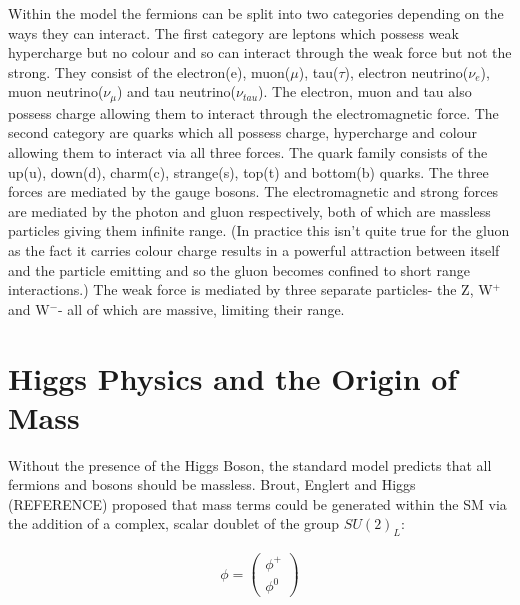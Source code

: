 Within the model the fermions can be split into two categories depending on the ways they can interact. The first category are leptons which possess weak hypercharge but no colour and so can interact through the weak force but not the strong. They consist of the electron(e), muon($\mu$), tau($\tau$), electron neutrino($\nu_{e}$), muon neutrino($\nu_{\mu}$) and tau neutrino($\nu_{tau}$). The electron, muon and tau also possess charge allowing them to interact through the electromagnetic force. The second category are quarks which all possess charge, hypercharge and colour allowing them to interact via all three forces. The quark family consists of the up(u), down(d), charm(c), strange(s), top(t) and bottom(b) quarks. The three forces are mediated by the gauge bosons. The electromagnetic and strong forces are mediated by the photon and gluon respectively, both of which are massless particles giving them infinite range. (In practice this isn't quite true for the gluon as the fact it carries colour charge results in a powerful attraction between itself and the particle emitting and so the gluon becomes confined to short range interactions.) The weak force is mediated by three separate particles- the Z, W$^+$ and W$^-$- all of which are massive, limiting their range. 



\section{Higgs Physics and the Origin of Mass}

Without the presence of the Higgs Boson, the standard model predicts that all fermions and bosons should be massless. Brout, Englert and Higgs (REFERENCE) proposed that mass terms could be generated within the \ac{SM} via the addition of a complex, scalar doublet of the group $SU(2)_{L}$:


\begin{align}
\phi = \begin{pmatrix} \phi^{+} \\ \phi^{0} \end{pmatrix} 
\end{align}



